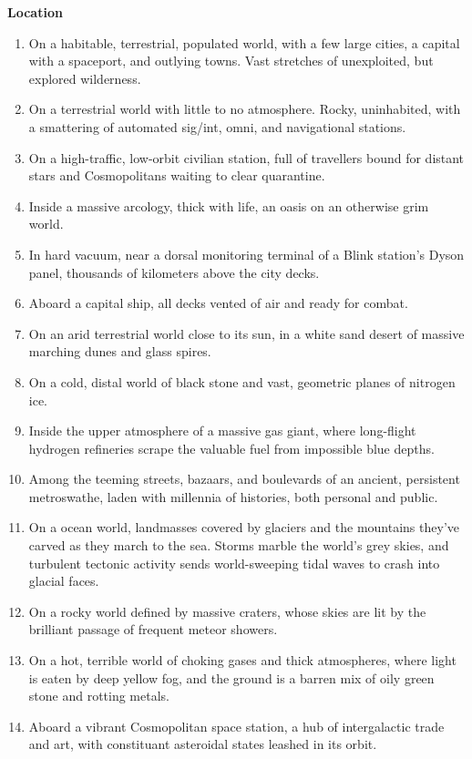     \textbf{Location}
\begin{enumerate}
    \item On a habitable, terrestrial, populated world, with a few large cities, a capital with a spaceport, and outlying towns. Vast stretches of unexploited, but explored wilderness.
    \item On a terrestrial world with little to no atmosphere. Rocky, uninhabited, with a smattering of automated sig/int, omni, and navigational stations.
    \item On a high-traffic, low-orbit civilian station, full of travellers bound for distant stars and Cosmopolitans waiting to clear quarantine.
    \item Inside a massive arcology, thick with life, an oasis on an otherwise grim world.
    \item In hard vacuum, near a dorsal monitoring terminal of a Blink station’s Dyson panel, thousands of kilometers above the city decks.
    \item Aboard a capital ship, all decks vented of air and ready for combat.
    \item On an arid terrestrial world close to its sun, in a white sand desert of massive marching dunes and glass spires.
    \item On a cold, distal world of black stone and vast, geometric planes of nitrogen ice.
    \item Inside the upper atmosphere of a massive gas giant, where long-flight hydrogen refineries scrape the valuable fuel from impossible blue depths.
    \item Among the teeming streets, bazaars, and boulevards of an ancient, persistent metroswathe, laden with millennia of histories, both personal and public.
    \item On a ocean world, landmasses covered by glaciers and the mountains they’ve carved as they march to the sea. Storms marble the world’s grey skies, and turbulent tectonic activity sends world-sweeping tidal waves to crash into glacial faces.
    \item On a rocky world defined by massive craters, whose skies are lit by the brilliant passage of frequent meteor showers.
    \item On a hot, terrible world of choking gases and thick atmospheres, where light is eaten by deep yellow fog, and the ground is a barren mix of oily green stone and rotting metals.
    \item Aboard a vibrant Cosmopolitan space station, a hub of intergalactic trade and art, with constituant asteroidal states leashed in its orbit.

\end{enumerate}
